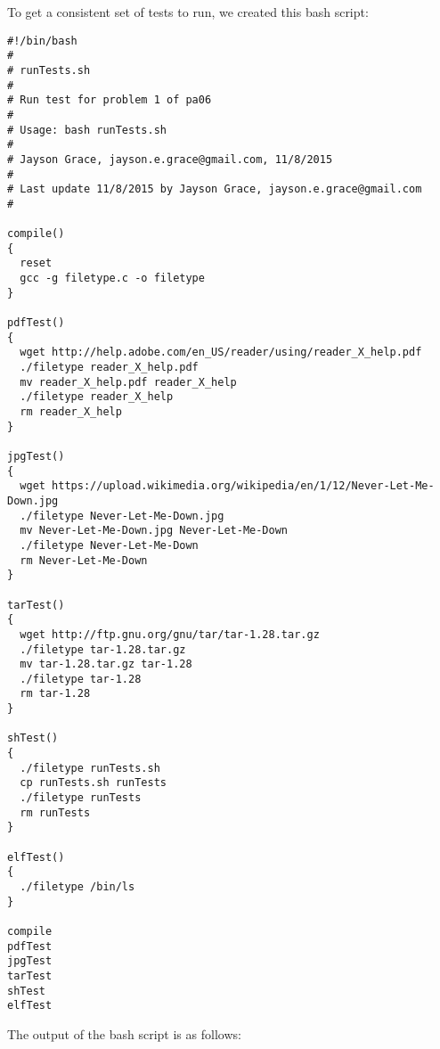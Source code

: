 \documentclass[12pt, a4paper, oneside]{article}
\begin{document}
\pagebreak

To get a consistent set of tests to run, we created this bash script: \\

\begin{lstlisting}
#!/bin/bash
# 
# runTests.sh
#
# Run test for problem 1 of pa06
#
# Usage: bash runTests.sh
#
# Jayson Grace, jayson.e.grace@gmail.com, 11/8/2015
#
# Last update 11/8/2015 by Jayson Grace, jayson.e.grace@gmail.com
# 

compile()
{
  reset
  gcc -g filetype.c -o filetype
}

pdfTest()
{
  wget http://help.adobe.com/en_US/reader/using/reader_X_help.pdf
  ./filetype reader_X_help.pdf
  mv reader_X_help.pdf reader_X_help
  ./filetype reader_X_help
  rm reader_X_help
}

jpgTest()
{
  wget https://upload.wikimedia.org/wikipedia/en/1/12/Never-Let-Me-Down.jpg
  ./filetype Never-Let-Me-Down.jpg
  mv Never-Let-Me-Down.jpg Never-Let-Me-Down
  ./filetype Never-Let-Me-Down
  rm Never-Let-Me-Down
}

tarTest()
{
  wget http://ftp.gnu.org/gnu/tar/tar-1.28.tar.gz
  ./filetype tar-1.28.tar.gz
  mv tar-1.28.tar.gz tar-1.28
  ./filetype tar-1.28
  rm tar-1.28
}

shTest()
{
  ./filetype runTests.sh
  cp runTests.sh runTests
  ./filetype runTests
  rm runTests
}

elfTest()
{
  ./filetype /bin/ls
}

compile
pdfTest
jpgTest
tarTest
shTest
elfTest
\end{lstlisting}

\pagebreak

The output of the bash script is as follows: \\
\end{document}

